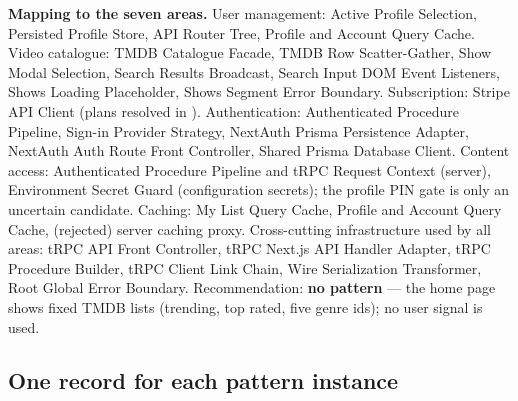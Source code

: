 \documentclass[11pt,a4paper]{article}
\begin{document}
\textbf{Mapping to the seven areas.} User management: Active Profile Selection, Persisted Profile Store, API Router Tree, Profile and Account Query Cache. Video catalogue: TMDB Catalogue Facade, TMDB Row Scatter-Gather, Show Modal Selection, Search Results Broadcast, Search Input DOM Event Listeners, Shows Loading Placeholder, Shows Segment Error Boundary. Subscription: Stripe API Client (plans resolved in ). Authentication: Authenticated Procedure Pipeline, Sign-in Provider Strategy, NextAuth Prisma Persistence Adapter, NextAuth Auth Route Front Controller, Shared Prisma Database Client. Content access: Authenticated Procedure Pipeline and tRPC Request Context (server), Environment Secret Guard (configuration secrets); the profile PIN gate is only an uncertain candidate. Caching: My List Query Cache, Profile and Account Query Cache, (rejected) server caching proxy. Cross-cutting infrastructure used by all areas: tRPC API Front Controller, tRPC Next.js API Handler Adapter, tRPC Procedure Builder, tRPC Client Link Chain, Wire Serialization Transformer, Root Global Error Boundary. Recommendation: \textbf{no pattern} --- the home page shows fixed TMDB lists (trending, top rated, five genre ids); no user signal is used.
\subsection{One record for each pattern instance}
\end{document}
